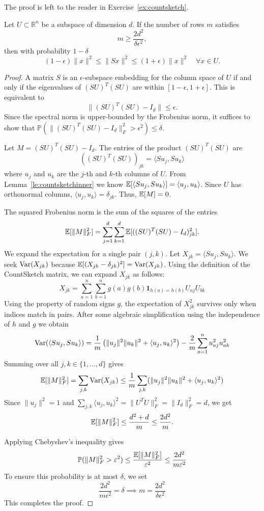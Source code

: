 The proof is left to the reader in Exercise~\ref{ex:countsketch}.


\begin{theorem}\label{thm:sketch-countsketch}
Let $U \subset \mathbb{R}^n$ be a subspace of dimension $d$. If the number of rows $m$ satisfies
$$m \ge \frac{2d^2}{\delta\epsilon^2},$$
then with probability $1-\delta$
$$(1-\epsilon)\|x\|^2 \le \|Sx\|^2 \le (1+\epsilon)\|x\|^2 \quad \forall x \in U.$$
\end{theorem}

\begin{proof}
A matrix $S$ is an $\epsilon$-subspace embedding for the column space of $U$ if and only if the eigenvalues of $(SU)^T (SU)$ are within $[1-\epsilon, 1+\epsilon]$. This is equivalent to
$$\| (SU)^T (SU) - I_d \| \le \epsilon.$$
Since the spectral norm is upper-bounded by the Frobenius norm, it suffices to show that 
$\mathbb{P}(\| (SU)^T (SU) - I_d \|_F^2 > \epsilon^2) \le \delta$.

Let $M = (SU)^T (SU) - I_d$. The entries of the product $(SU)^T (SU)$ are
$$((SU)^T (SU))_{jk} = \langle Su_j, Su_k \rangle$$
where $u_j$ and $u_k$ are the $j$-th and $k$-th columns of $U$.
From Lemma~\ref{le:countsketchinner} we know $\mathbb{E}[\langle Su_j, Su_k \rangle] = \langle u_j, u_k \rangle$.
Since $U$ has orthonormal columns, $\langle u_j, u_k \rangle = \delta_{jk}$. Thus, $\mathbb{E}[M] = 0$.

The squared Frobenius norm is the sum of the squares of the entries
$$\mathbb{E}[\|M\|_F^2] = \sum_{j=1}^d \sum_{k=1}^d \mathbb{E}[((SU)^T (SU) - I_d)_{jk}^2].$$
We expand the expectation for a single pair $(j, k)$. Let $X_{jk} = \langle Su_j, Su_k \rangle$. We seek $\operatorname{Var}(X_{jk})$ because $\mathbb{E}[(X_{jk} - \delta_{jk})^2] = \operatorname{Var}(X_{jk})$.
Using the definition of the CountSketch matrix, we can expand
$X_{jk}$ as follows:
$$X_{jk} = \sum_{a=1}^n \sum_{b=1}^n g(a)g(b) \mathbf{1}_{h(a)=h(b)} U_{aj} U_{bk}$$
Using the property of random signs $g$, the expectation of $X_{jk}^2$ survives only when indices match in pairs. After some algebraic simplification using the independence of $h$ and $g$ we obtain
$$\operatorname{Var}(\langle Su_j, Su_k \rangle) = \frac{1}{m} \left( \|u_j\|^2 \|u_k\|^2 + \langle u_j, u_k \rangle^2 \right) - \frac{2}{m} \sum_{a=1}^n u_{aj}^2 u_{ak}^2$$
Summing over all $j, k \in \{1, \dots, d\}$ gives
$$\mathbb{E}[\|M\|_F^2] = \sum_{j,k} \operatorname{Var}(X_{jk}) \le \frac{1}{m} \sum_{j,k} (\|u_j\|^2 \|u_k\|^2 + \langle u_j, u_k \rangle^2)$$
Since $\|u_j\|^2 = 1$ and $\sum_{j,k} \langle u_j, u_k \rangle^2 = \|U^T U\|_F^2 = \|I_d\|_F^2 = d$, we get
$$\mathbb{E}[\|M\|_F^2] \le \frac{d^2 + d}{m} \le \frac{2d^2}{m}.$$

Applying Chebyshev's inequality gives
$$\mathbb{P}(\|M\|_F^2 > \varepsilon^2) \le \frac{\mathbb{E}[\|M\|_F^2]}{\varepsilon^2} \le \frac{2d^2}{m \varepsilon^2}$$
To ensure this probability is at most $\delta$, we set
$$\frac{2d^2}{m \epsilon^2} = \delta \implies m = \frac{2d^2}{\delta \epsilon^2}$$
This completes the proof. 
\end{proof}


